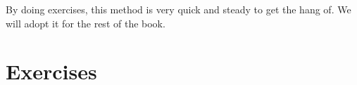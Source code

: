 \documentclass[../master.tex]{subfiles}
\begin{document}

	By doing exercises, this method is very quick and steady to get the hang of. We will adopt it for the rest of the book.
	
	
	\section{Exercises} %
	\label{sec:exercises1}
	
\end{document}
